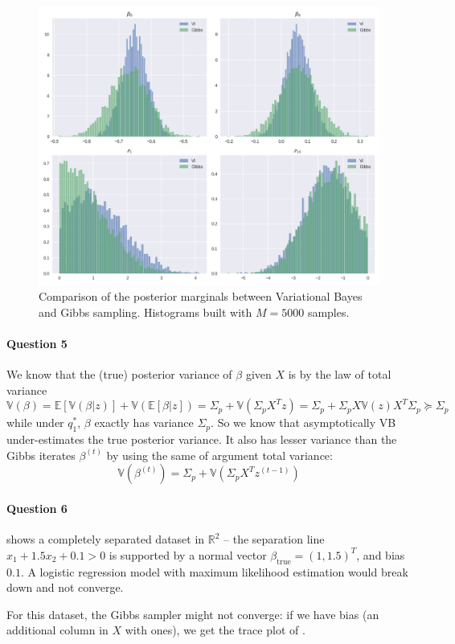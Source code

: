 \documentclass[11pt]{article}
\newcommand\RR{\mathbb{R}}
\newcommand\EE{\mathbb{E}}
\newcommand\VV{\mathbb{V}}
\begin{document}
\begin{figure}[h]
	\centering
	\includegraphics[width=.75\linewidth]{images/posterior_VI_Gibbs_comparison_1.png}
	\caption{Comparison of the posterior marginals between Variational Bayes and Gibbs sampling. Histograms built with $M=5000$ samples.}\label{fig:VBGibbsPosteriorComparison}
\end{figure}

\paragraph{Question 5} We know that the (true) posterior variance of $\beta$ given $X$ is by the law of total variance
\[
	\VV(\beta) = \EE[\VV(\beta|z)] + \VV(\EE[\beta|z]) = \Sigma_p + \VV(\Sigma_pX^Tz) = \Sigma_p + \Sigma_pX\VV(z)X^T\Sigma_p \succeq \Sigma_p
\]
while under $q^*_1$, $\beta$ exactly has variance $\Sigma_p$. So we know that asymptotically VB under-estimates the true posterior variance. It also has lesser variance than the Gibbs iterates $\beta^{(t)}$ by using the same of argument total variance:
\[
	\VV(\beta^{(t)}) = \Sigma_p + \VV(\Sigma_p X^Tz^{(t-1)})
\]


\paragraph{Question 6}


 shows a completely separated dataset in $\RR^2$ -- the separation line $x_1 + 1.5x_2 + 0.1 > 0$ is supported by a normal vector $\beta_\mathrm{true} = (1, 1.5)^T$, and bias $0.1$. A logistic regression model with maximum likelihood estimation would break down and not converge.

For this dataset, the Gibbs sampler might not converge: if we have bias (an additional column in $X$ with ones), we get the trace plot of .
\end{document}
